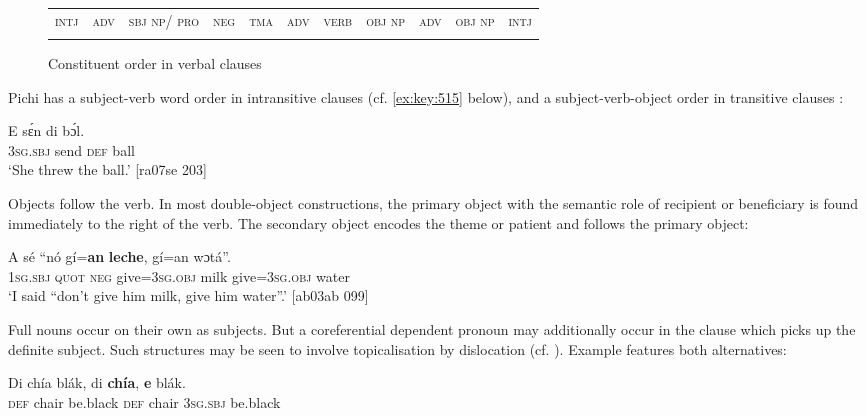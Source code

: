 \begin{figure}
\caption{Constituent order in verbal clauses}
\label{fig:key:7.1}

\begin{tabularx}{\textwidth}{XXXXXXXXXXX}
\lsptoprule
\textsc{intj} & \textsc{adv} & \textsc{sbj} \textsc{np/} \textsc{pro} & \textsc{neg} & \textsc{tma} & \textsc{adv} & \textsc{verb} & \textsc{obj} \textsc{np} & \textsc{adv} & \textsc{obj} \textsc{np} & \textsc{intj}\\
\lspbottomrule
\end{tabularx}
\end{figure}
Pichi has a subject-verb word order in intransitive clauses (cf. \ref{ex:key:515} below), and a subject-verb-object order in transitive clauses : 


\ea%
    \label{ex:key:513}
    \gll E    sɛ́n    di  bɔ́l.\\
\textsc{3sg.sbj}  send  \textsc{def}  ball\\

\glt ‘She threw the ball.’ [ra07se 203]
\z

Objects follow the verb. In most double-object constructions, the primary object with the semantic role of recipient or beneficiary is found immediately to the right of the verb. The secondary object encodes the theme or patient and follows the primary object:


\ea%
    \label{ex:key:514}
    \gll A    sé    “nó  gí=\textbf{an}    \textbf{leche},  gí=an    wɔtá”.\\
\textsc{1sg.sbj}  \textsc{quot}    \phantom{“}\textsc{neg}  give=\textsc{3sg.obj}  milk    give=\textsc{3sg.obj}  water\\

\glt ‘I said “don’t give him milk, give him water”.' [ab03ab 099]
\z

Full nouns occur on their own as subjects. But a coreferential dependent pronoun may additionally occur in the clause which picks up the definite subject. Such structures may be seen to involve topicalisation by dislocation (cf. ). Example  features both alternatives:


\ea%
    \label{ex:key:515}
    \gll Di  chía    blák,  di  \textbf{chía},  \textbf{e}    blák.\\
\textsc{def}  chair  be.black  \textsc{def}  chair  \textsc{3sg.sbj}  be.black\\

